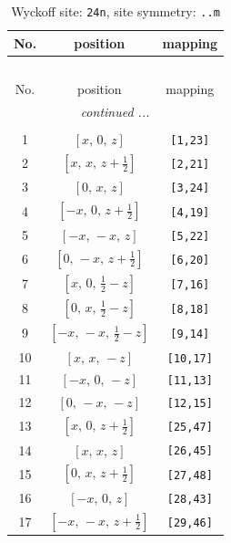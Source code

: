 \documentclass[fleqn,8pt]{jsarticle}
\begin{document}
\begin{longtable}{ccc}
\caption{Wyckoff site: {\tt 24n}, site symmetry: {\tt ..m}}
 \\
 \hline \hline
No. & position & mapping \\ \hline \endfirsthead

\multicolumn{2}{l}{\tablename\ \thetable{}} \\
 \hline \hline
No. & position & mapping \\ \hline \endhead

 \hline \hline
\multicolumn{2}{r}{\footnotesize\it continued ...} \\ \endfoot

 \hline \hline
\multicolumn{2}{r}{} \\ \endlastfoot

1 & $\left[ x,\, 0,\, z \right]$ & {\tt [1,23]} \\ \hline
2 & $\left[ x,\, x,\, z + \frac{1}{2} \right]$ & {\tt [2,21]} \\ \hline
3 & $\left[ 0,\, x,\, z \right]$ & {\tt [3,24]} \\ \hline
4 & $\left[ - x,\, 0,\, z + \frac{1}{2} \right]$ & {\tt [4,19]} \\ \hline
5 & $\left[ - x,\, - x,\, z \right]$ & {\tt [5,22]} \\ \hline
6 & $\left[ 0,\, - x,\, z + \frac{1}{2} \right]$ & {\tt [6,20]} \\ \hline
7 & $\left[ x,\, 0,\, \frac{1}{2} - z \right]$ & {\tt [7,16]} \\ \hline
8 & $\left[ 0,\, x,\, \frac{1}{2} - z \right]$ & {\tt [8,18]} \\ \hline
9 & $\left[ - x,\, - x,\, \frac{1}{2} - z \right]$ & {\tt [9,14]} \\ \hline
10 & $\left[ x,\, x,\, - z \right]$ & {\tt [10,17]} \\ \hline
11 & $\left[ - x,\, 0,\, - z \right]$ & {\tt [11,13]} \\ \hline
12 & $\left[ 0,\, - x,\, - z \right]$ & {\tt [12,15]} \\ \hline
13 & $\left[ x,\, 0,\, z + \frac{1}{2} \right]$ & {\tt [25,47]} \\ \hline
14 & $\left[ x,\, x,\, z \right]$ & {\tt [26,45]} \\ \hline
15 & $\left[ 0,\, x,\, z + \frac{1}{2} \right]$ & {\tt [27,48]} \\ \hline
16 & $\left[ - x,\, 0,\, z \right]$ & {\tt [28,43]} \\ \hline
17 & $\left[ - x,\, - x,\, z + \frac{1}{2} \right]$ & {\tt [29,46]} \\ \hline

\end{longtable}
\end{document}
